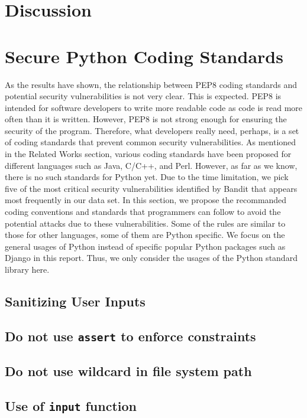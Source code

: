 \documentclass[acmlarge]{acmart}
\begin{document}
\section{Discussion}

\section{Secure Python Coding Standards}
As the results have shown, the relationship between PEP8 coding standards and potential security vulnerabilities is not very clear. This is expected. PEP8 is intended for software developers to write more readable code as code is read more often than it is written\cite{PEP8}. However, PEP8\cite{PEP8} is not strong enough for ensuring the security of the program. Therefore, what developers really need, perhaps, is a set of coding standards that prevent common security vulnerabilities. As mentioned in the Related Works section, various coding standards have been proposed for different languages such as Java, C/C++, and Perl\cite{SEI_CERT}. However, as far as we know, there is no such standards for Python yet. Due to the time limitation, we pick five of the most critical security vulnerabilities identified by Bandit that appears most frequently in our data set. In this section, we propose the recommanded coding conventions and standards that programmers can follow to avoid the potential attacks due to these vulnerabilities. Some of the rules are similar to those for other languages, some of them are Python specific. We focus on the general usages of Python instead of specific popular Python packages such as Django in this report. Thus, we only consider the usages of the Python standard library here. 

\subsection{Sanitizing User Inputs}

\subsection{Do not use \texttt{assert} to enforce constraints}

\subsection{Do not use wildcard in file system path}

\subsection{Use of \texttt{input} function}
\end{document}
